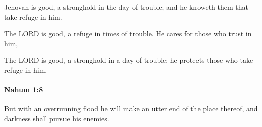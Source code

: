 			\begin{versebox}
					\item[BHS] 
					\item[LXX] 
					\item[ASV] Jehovah is good, a stronghold in the day of trouble; and he knoweth them that take refuge in him.
					\item[NIV] The LORD is good, a refuge in times of trouble. He cares for those who trust in him,
					\item[NRSV] The LORD is good, a stronghold in a day of trouble; he protects those who take refuge in him,
			\end{versebox}

		\paragraph{Nahum 1:8} %
			\label{NAHUM-1-8}

			But with an overrunning flood he will make an utter end of the place thereof, and darkness shall pursue his enemies.

